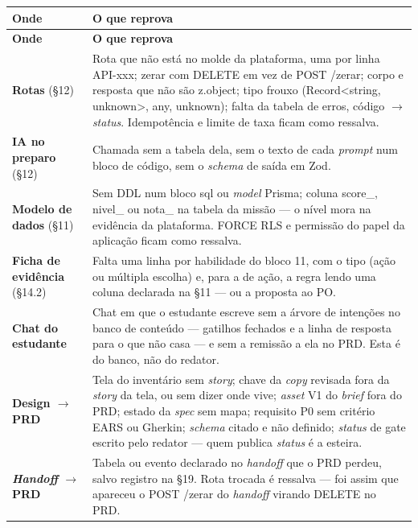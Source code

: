 \documentclass[11pt,a4paper]{article}
\newcommand{\cod}[1]{{\ttfamily\small #1}}
\begin{document}
\begin{center}
\begin{longtable}{>{\raggedright\arraybackslash}p{3.2cm}p{11.4cm}}
\toprule
\sffamily\bfseries\footnotesize\color{unNavy}Onde & \sffamily\bfseries\footnotesize\color{unNavy}O que reprova \\
\midrule
\endfirsthead
\toprule
\sffamily\bfseries\footnotesize\color{unNavy}Onde & \sffamily\bfseries\footnotesize\color{unNavy}O que reprova \\
\midrule
\endhead
\footnotesize\textbf{Rotas} (\S12) & \footnotesize Rota que não está no molde da plataforma, uma por linha \cod{API-xxx}; zerar com \cod{DELETE} em vez de \cod{POST /zerar}; corpo e resposta que não são \cod{z.object}; tipo frouxo (\cod{Record<string, unknown>}, \cod{any}, \cod{unknown}); falta da tabela de erros, código $\rightarrow$ \emph{status}. Idempotência e limite de taxa ficam como ressalva. \\
\addlinespace
\footnotesize\textbf{IA no preparo} (\S12) & \footnotesize Chamada sem a tabela dela, sem o texto de cada \emph{prompt} num bloco de código, sem o \emph{schema} de saída em Zod. \\
\addlinespace
\footnotesize\textbf{Modelo de dados} (\S11) & \footnotesize Sem DDL num bloco \cod{sql} ou \emph{model} Prisma; coluna \cod{score\_}, \cod{nivel\_} ou \cod{nota\_} na tabela da missão --- o nível mora na evidência da plataforma. \cod{FORCE RLS} e permissão do papel da aplicação ficam como ressalva. \\
\addlinespace
\footnotesize\textbf{Ficha de evidência} (\S14.2) & \footnotesize Falta uma linha por habilidade do bloco 11, com o tipo (ação ou múltipla escolha) e, para a de ação, a regra lendo uma coluna declarada na \S11 --- ou a proposta ao PO. \\
\addlinespace
\footnotesize\textbf{Chat do estudante} & \footnotesize Chat em que o estudante escreve sem a árvore de intenções no banco de conteúdo --- gatilhos fechados e a linha de resposta para o que não casa --- e sem a remissão a ela no PRD. Esta é do banco, não do redator. \\
\addlinespace
\footnotesize\textbf{Design $\rightarrow$ PRD} & \footnotesize Tela do inventário sem \emph{story}; chave da \emph{copy} revisada fora da \emph{story} da tela, ou sem dizer onde vive; \emph{asset} V1 do \emph{brief} fora do PRD; estado da \emph{spec} sem mapa; requisito P0 sem critério EARS ou Gherkin; \emph{schema} citado e não definido; \emph{status} de gate escrito pelo redator --- quem publica \emph{status} é a esteira. \\
\addlinespace
\footnotesize\textbf{\emph{Handoff} $\rightarrow$ PRD} & \footnotesize Tabela ou evento declarado no \emph{handoff} que o PRD perdeu, salvo registro na \S19. Rota trocada é ressalva --- foi assim que apareceu o \cod{POST /zerar} do \emph{handoff} virando \cod{DELETE} no PRD. \\
\bottomrule
\end{longtable}
\end{center}
\end{document}
